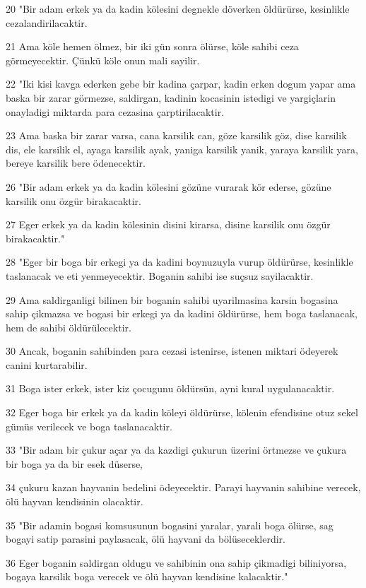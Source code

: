 \par 20 "Bir adam erkek ya da kadin kölesini degnekle döverken öldürürse, kesinlikle cezalandirilacaktir.
\par 21 Ama köle hemen ölmez, bir iki gün sonra ölürse, köle sahibi ceza görmeyecektir. Çünkü köle onun mali sayilir.
\par 22 "Iki kisi kavga ederken gebe bir kadina çarpar, kadin erken dogum yapar ama baska bir zarar görmezse, saldirgan, kadinin kocasinin istedigi ve yargiçlarin onayladigi miktarda para cezasina çarptirilacaktir.
\par 23 Ama baska bir zarar varsa, cana karsilik can, göze karsilik göz, dise karsilik dis, ele karsilik el, ayaga karsilik ayak, yaniga karsilik yanik, yaraya karsilik yara, bereye karsilik bere ödenecektir.
\par 26 "Bir adam erkek ya da kadin kölesini gözüne vurarak kör ederse, gözüne karsilik onu özgür birakacaktir.
\par 27 Eger erkek ya da kadin kölesinin disini kirarsa, disine karsilik onu özgür birakacaktir."
\par 28 "Eger bir boga bir erkegi ya da kadini boynuzuyla vurup öldürürse, kesinlikle taslanacak ve eti yenmeyecektir. Boganin sahibi ise suçsuz sayilacaktir.
\par 29 Ama saldirganligi bilinen bir boganin sahibi uyarilmasina karsin bogasina sahip çikmazsa ve bogasi bir erkegi ya da kadini öldürürse, hem boga taslanacak, hem de sahibi öldürülecektir.
\par 30 Ancak, boganin sahibinden para cezasi istenirse, istenen miktari ödeyerek canini kurtarabilir.
\par 31 Boga ister erkek, ister kiz çocugunu öldürsün, ayni kural uygulanacaktir.
\par 32 Eger boga bir erkek ya da kadin köleyi öldürürse, kölenin efendisine otuz sekel gümüs verilecek ve boga taslanacaktir.
\par 33 "Bir adam bir çukur açar ya da kazdigi çukurun üzerini örtmezse ve çukura bir boga ya da bir esek düserse,
\par 34 çukuru kazan hayvanin bedelini ödeyecektir. Parayi hayvanin sahibine verecek, ölü hayvan kendisinin olacaktir.
\par 35 "Bir adamin bogasi komsusunun bogasini yaralar, yarali boga ölürse, sag bogayi satip parasini paylasacak, ölü hayvani da bölüseceklerdir.
\par 36 Eger boganin saldirgan oldugu ve sahibinin ona sahip çikmadigi biliniyorsa, bogaya karsilik boga verecek ve ölü hayvan kendisine kalacaktir."

